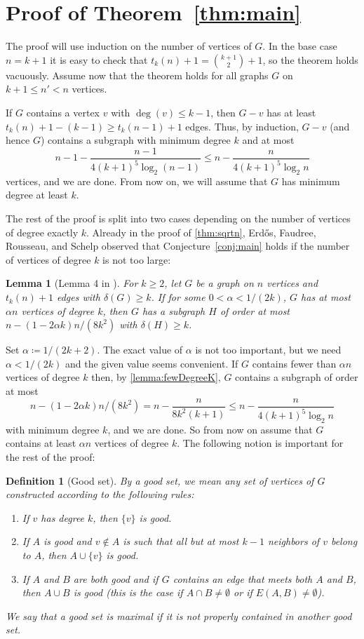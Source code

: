 \documentclass[11pt]{article}
\numberwithin{theorem}{section}
\newtheorem{lemma}[theorem]{Lemma}
\newtheorem{definition}[theorem]{Definition}
\begin{document}
\section{Proof of Theorem~\ref{thm:main}}

The proof will use induction on the number of vertices of $G$. In the base
case $n=k+1$ it is easy to check that $t_k(n)+1 = \binom{k+1}{2}+1$, so the
theorem holds vacuously. Assume now that the theorem holds for all graphs $G$
on $k+1\leq n'<n$ vertices.

If $G$ contains a vertex $v$ with $\deg(v)\leq k-1$, then $G-v$ has at least
$t_k(n)+1- (k-1)\geq t_k(n-1)+1$ edges. Thus, by induction, $G-v$ (and
hence $G$) contains a subgraph with minimum degree $k$ and at most
\[ n-1 - \frac{n-1}{4(k+1)^5\log_2(n-1)} \leq n - \frac{n}{4(k+1)^5\log_2 n} \]
vertices, and we are done. From now on, we will assume that $G$
has minimum degree at least $k$.

The rest of the proof is split into two cases depending on the number of
vertices of degree exactly $k$. Already in the proof of \autoref{thm:sqrtn},
Erd\H{o}s, Faudree, Rousseau, and Schelp observed that
Conjecture~\ref{conj:main} holds if the number of vertices of degree $k$ is
not too large:
\begin{lemma}[Lemma 4 in \cite{ERDOS199053}]\label{lemma:fewDegreeK}
  For $k\geq 2 $, let $G$ be a graph on $n$ vertices and $t_k(n)+1$ edges with
  $\delta(G)\geq k$. If for some $0<\alpha <1/(2k)$, $G$ has at most
  $\alpha n$ vertices of degree $k$, then $G$ has a subgraph $H$ of order at
  most $n-(1-2\alpha k)n/(8k^2)$ with $\delta(H)\geq k$.
\end{lemma}

Set $\alpha \coloneqq 1/(2k+2)$. The exact value of $\alpha$ is not too
important, but we need $\alpha < 1/(2k)$ and the given value seems
convenient. If $G$ contains fewer than $\alpha n$ vertices of degree $k$
then, by \autoref{lemma:fewDegreeK}, $G$ contains a subgraph of order at most
\[ n-(1-2\alpha k)n/(8k^2) = n - \frac{n}{8k^2(k+1)}
\leq n - \frac{n}{4(k+1)^5\log_2 n}\]
with minimum degree $k$, and we are done. So from now on assume that $G$
contains at least $\alpha n$ vertices of degree $k$.
The following notion is important for the rest of the proof:

\begin{definition}[Good set]\label{def:good}
  By a \emph{good set}, we mean any set of vertices of $G$ constructed
  according to the following rules:
  \begin{enumerate}
    \item If $v$ has degree $k$, then $\{v\}$ is good.
    \item If $A$ is good and $v\notin A$ is such that all but
      at most $k-1$ neighbors of $v$ belong to $A$, then $A\cup \{v\}$ is good.
    \item If $A$ and $B$ are both good and if $G$ contains
      an edge that meets both $A$ and $B$, then $A\cup B$ is good
      (this is the case if $A\cap B\neq \emptyset$ or if $E(A,B)\neq
      \emptyset$).
  \end{enumerate}
  We say that a good set is \emph{maximal} if it is not properly contained in
  another good set. 
\end{definition}
\end{document}
